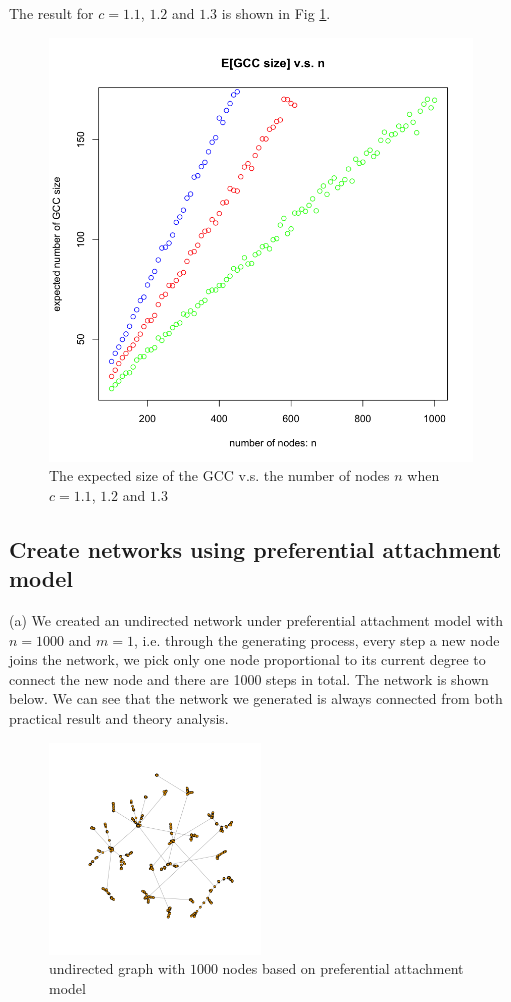 \documentclass[draftcls,12pt,onecolumn]{IEEEtran}
\begin{document}
The result for $c=1.1$, $1.2$ and $1.3$ is shown in Fig \ref{fig014}.
\begin{figure}[H]
\centering
\includegraphics[scale=0.3]{figures_part1_1/output_24_0.png}
\caption{The expected size of the GCC v.s. the number of nodes $n$ when $c=1.1$, $1.2$ and $1.3$}
\label{fig014}
\end{figure}







\subsection{Create networks using preferential attachment model}
(a) We created an undirected network under preferential attachment model with $n = 1000$ and $m = 1$, i.e. through the generating process, every step a new node joins the network, we pick only one node proportional to its current degree to connect the new node and there are 1000 steps in total. The network is shown below. We can see that the network we generated is always connected from both practical result and theory analysis.
\begin{figure}[H]
\centering
\includegraphics[width=0.5\textwidth]{1_2_a_network.png}
\caption{undirected graph with $1000$ nodes based on preferential attachment model}
\end{figure}
\end{document}
